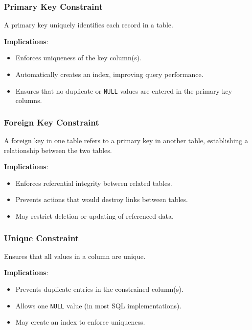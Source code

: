 \documentclass[12pt]{article}
\begin{document}
\subsubsection*{Primary Key Constraint}

A primary key uniquely identifies each record in a table.

\textbf{Implications}:

\begin{itemize}
    \item Enforces uniqueness of the key column(s).
    \item Automatically creates an index, improving query performance.
    \item Ensures that no duplicate or \texttt{NULL} values are entered in the primary key columns.
\end{itemize}

\subsubsection*{Foreign Key Constraint}

A foreign key in one table refers to a primary key in another table, establishing a relationship between the two tables.

\textbf{Implications}:

\begin{itemize}
    \item Enforces referential integrity between related tables.
    \item Prevents actions that would destroy links between tables.
    \item May restrict deletion or updating of referenced data.
\end{itemize}

\subsubsection*{Unique Constraint}

Ensures that all values in a column are unique.

\textbf{Implications}:

\begin{itemize}
    \item Prevents duplicate entries in the constrained column(s).
    \item Allows one \texttt{NULL} value (in most SQL implementations).
    \item May create an index to enforce uniqueness.
\end{itemize}
\end{document}
